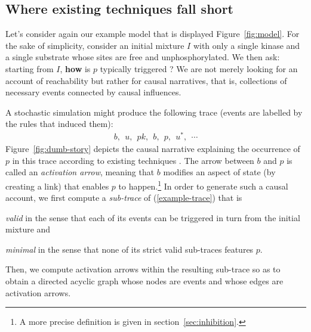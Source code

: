 \subsection{Where existing techniques fall short}


Let's consider again our example model that is displayed
Figure~\ref{fig:model}.  For the sake of simplicity, consider an
initial mixture $I$ with only a single kinase and a single substrate
whose sites are free and unphosphorylated. We then ask: starting from
$I$, \textbf{how} is $p$ typically triggered ? We are not merely
looking for an account of reachability but rather for causal
narratives, that is, collections of necessary events connected by
causal influences.

A stochastic simulation might produce the following trace (events are
labelled by the rules that induced them):
\begin{align}\label{example-trace} b,\ \ u,\ \ pk,\ \ b,\ \ p,\ \
  u^{*},\ \ \cdots
\end{align} Figure~\ref{fig:dumb-story} depicts the causal narrative
explaining the occurrence of $p$ in this trace according to existing techniques
\cite{DBLP:conf/fsttcs/DanosFFHH12,DanosEtAl-CONCUR07}. The arrow
between $b$ and $p$ is called an \textit{activation arrow}, meaning
that $b$ modifies an aspect of state (by creating a link) that enables
$p$ to happen.\footnote{A more precise definition is given in section~\ref{sec:inhibition}.} In order to generate such a causal account, we first compute
a \emph{sub-trace} of (\ref{example-trace}) that is 
\begin{inparaenum}[(i)]
\item \emph{valid} in the sense that each of its events can be
  triggered in turn from the initial mixture and
\item \emph{minimal} in the sense that none of its strict valid
  sub-traces features $p$.
\end{inparaenum}
Then, we compute activation arrows within the resulting sub-trace so
as to obtain a directed acyclic graph whose nodes are events and whose
edges are activation arrows.



